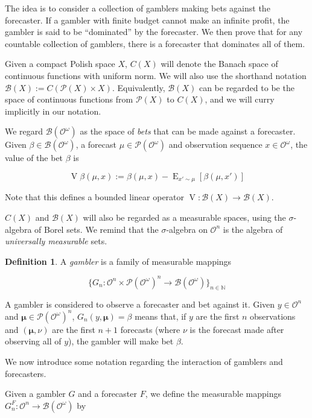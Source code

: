 \documentclass[11pt]{article}
\theoremstyle{definition}
\newtheorem{definition}{Definition}%
\theoremstyle{plain}
\newcommand{\Nats}{\mathbb{N}}
\newcommand{\Sq}[2]{\{#1\}_{#2 \in \Nats}}
\newcommand{\Sqn}[1]{\Sq{#1}{n}}
\DeclareMathOperator{\E}{E}
\newcommand{\PM}{\mathcal{P}}
\newcommand{\Ob}{\mathcal{O}}
\newcommand{\OO}{\Ob^\omega}
\newcommand{\PMO}{\PM(\OO)}
\newcommand{\Gm}{\mathcal{B}}
\newcommand{\GMO}{\Gm(\OO)}
\DeclareMathOperator{\V}{V}
\newcommand{\BM}{\bm{\mu}}
\begin{document}
The idea is to consider a collection of gamblers making bets against the forecaster. If a gambler with finite budget cannot make an infinite profit, the gambler is said to be \enquote{dominated} by the forecaster. We then prove that for any countable collection of gamblers, there is a forecaster that dominates all of them.

Given a compact Polish space $X$, $C(X)$ will denote the Banach space of continuous functions with uniform norm. We will also use the shorthand notation $\Gm(X):=C(\PM(X) \times X)$. Equivalently, $\Gm(X)$ can be regarded to be the space of continuous functions from $\PM(X)$ to $C(X)$, and we will curry implicitly in our notation.

We regard $\GMO$ as the space of \emph{bets} that can be made against a forecaster. Given $\beta \in \GMO$, a forecast $\mu \in \PMO$ and observation sequence $x \in \OO$, the value of the bet $\beta$ is

\begin{equation}
\V{\beta}(\mu,x):=\beta(\mu,x) - \E_{x' \sim \mu}[\beta(\mu,x')]
\end{equation}

Note that this defines a bounded linear operator $\V: \Gm(X) \rightarrow \Gm(X)$.

$C(X)$ and $\Gm(X)$ will also be regarded as a measurable spaces, using the $\sigma$-algebra of Borel sets. We remind that the $\sigma$-algebra on $\Ob^n$ is the algebra of \emph{universally measurable} sets.

\begin{definition}

A \emph{gambler} is a family of measurable mappings

\[\Sqn{G_n : \Ob^n \times \PMO^n \rightarrow \Gm(\OO)}\]

\end{definition}

A gambler is considered to observe a forecaster and bet against it. Given $y \in \Ob^n$ and $\BM \in \PMO^n$, $G_n(y,\BM)=\beta$ means that, if $y$ are the first $n$ observations and $(\BM,\nu)$ are the first $n + 1$ forecasts (where $\nu$ is the forecast made after observing all of $y$), the gambler will make bet $\beta$.

We now introduce some notation regarding the interaction of gamblers and forecasters. 

Given a gambler $G$ and a forecaster $F$, we define the measurable mappings $G^F_n: \Ob^n \rightarrow \GMO$ by
\end{document}
